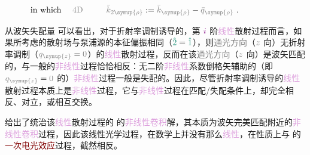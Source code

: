 \begin{subequations}
\begin{align}
	\hspace{-4.0em} \text{in which}\ \ \ \ \text{\textcolor{gray}{4D}} \ \ \ \ \ \ \ \ \;\! \mathcolor{gray}{\bar{k}_{2\symup{\rho}}} :=\; & \mathcolor{gray}{\bar{k}_{\symup{\rho}}} - \mathcolor{gray}{\bar{q}_{\symup{\rho}}} \label{eq:Born_approx-scalar-g-E-12-convolution7} ~.
\end{align}
\end{subequations}

从\textcolor{PineGreen}{波矢失配量}  可以看出，对于\textcolor{PineGreen}{折射率}\textcolor{NavyBlue}{调制}诱导的，第 $\textcolor{Plum}{i}$ 阶\textcolor{Plum}{线性}\textcolor{NavyBlue}{散射}过程而言，如果所考虑的\textcolor{NavyBlue}{散射场}与\textcolor{NavyBlue}{泵浦源}的\textcolor{PineGreen}{本征偏振}相同（$\textcolor{PineGreen}{\hat{2}} = \textcolor{PineGreen}{\hat{1}}$），则\textcolor{gray}{通光方向}（$\mathcolor{gray}{z}$ 向）无\textcolor{PineGreen}{折射率}\textcolor{NavyBlue}{调制}（$\mathcolor{gray}{q_{\symup{z}}} = \mathcolor{gray}{0}$）的\textcolor{Plum}{线性}\textcolor{NavyBlue}{散射}过程，反而在该\textcolor{gray}{通光方向}（$\mathcolor{gray}{z}$ 向）是\textcolor{PineGreen}{波矢匹配}的，与一般的\textcolor{Plum}{非线性}过程恰恰相反：无二阶\textcolor{Plum}{非线性}系数\textcolor{NavyBlue}{倒格矢}辅助的（即 $\mathcolor{gray}{q_{\symup{z}}} = \mathcolor{gray}{0}$ 的）\textcolor{Plum}{非线性}过程一般是\textcolor{PineGreen}{失配}的。因此，尽管\textcolor{PineGreen}{折射率}\textcolor{NavyBlue}{调制}诱导的\textcolor{Plum}{线性}\textcolor{NavyBlue}{散射}过程本质上是\textcolor{Plum}{非线性}过程，它与\textcolor{Plum}{非线性}过程在\textcolor{PineGreen}{匹配}/\textcolor{PineGreen}{失配}条件上，却完全相反、对立，或相互交换。

 给出了统治该\textcolor{Plum}{线性}\textcolor{NavyBlue}{散射}过程的  的\textcolor{Plum}{非线性卷积}解，其本质为\textcolor{PineGreen}{波矢完美匹配}附近的\textcolor{Plum}{非线性卷积}过程，因此该\textcolor{PineGreen}{线性光学}过程，在数学上并没有那么\textcolor{Plum}{线性}，在性质上与  的\textcolor{Maroon}{一次电光效应}过程，截然相反。

